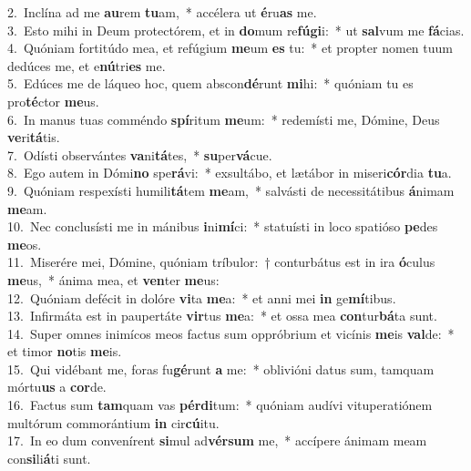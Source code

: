 {2.~}Inclína ad me \textbf{au}rem \textbf{tu}am,~* accélera ut \textbf{é}ru\textbf{as} me.\\
{3.~}Esto mihi in Deum protectórem, et in \textbf{do}mum re\textbf{fú}\textbf{gi}i:~* ut \textbf{sal}vum me \textbf{fá}cias.\\
{4.~}Quóniam fortitúdo mea, et refúgium \textbf{me}um \textbf{es} tu:~* et propter nomen tuum dedúces me, et e\textbf{nú}tri\textbf{es} me.\\
{5.~}Edúces me de láqueo hoc, quem abscon\textbf{dé}runt \textbf{mi}hi:~* quóniam tu es pro\textbf{té}ctor \textbf{me}us.\\
{6.~}In manus tuas comméndo \textbf{spí}ritum \textbf{me}um:~* redemísti me, Dómine, Deus \textbf{ve}ri\textbf{tá}tis.\\
{7.~}Odísti observántes \textbf{va}ni\textbf{tá}tes,~* \textbf{su}per\textbf{vá}cue.\\
{8.~}Ego autem in Dómi\textbf{no} spe\textbf{rá}vi:~* exsultábo, et lætábor in miseri\textbf{cór}dia \textbf{tu}a.\\
{9.~}Quóniam respexísti humili\textbf{tá}tem \textbf{me}am,~* salvásti de necessitátibus \textbf{á}nimam \textbf{me}am.\\
{10.~}Nec conclusísti me in mánibus \textbf{i}ni\textbf{mí}ci:~* statuísti in loco spatióso \textbf{pe}des \textbf{me}os.\\
{11.~}Miserére mei, Dómine, quóniam tríbulor:~† conturbátus est in ira \textbf{ó}culus \textbf{me}us,~* ánima mea, et \textbf{ven}ter \textbf{me}us:\\
{12.~}Quóniam defécit in dolóre \textbf{vi}ta \textbf{me}a:~* et anni mei \textbf{in} ge\textbf{mí}tibus.\\
{13.~}Infirmáta est in paupertáte \textbf{vir}tus \textbf{me}a:~* et ossa mea \textbf{con}tur\textbf{bá}ta sunt.\\
{14.~}Super omnes inimícos meos factus sum oppróbrium et vicínis \textbf{me}is \textbf{val}de:~* et timor \textbf{no}tis \textbf{me}is.\\
{15.~}Qui vidébant me, foras fu\textbf{gé}runt \textbf{a} me:~* oblivióni datus sum, tamquam mórtu\textbf{us} a \textbf{cor}de.\\
{16.~}Factus sum \textbf{tam}quam vas \textbf{pér}\textbf{di}tum:~* quóniam audívi vituperatiónem multórum commorántium \textbf{in} cir\textbf{cú}itu.\\
{17.~}In eo dum convenírent \textbf{si}mul ad\textbf{vér}\textbf{sum} me,~* accípere ánimam meam con\textbf{si}li\textbf{á}ti sunt.\\
